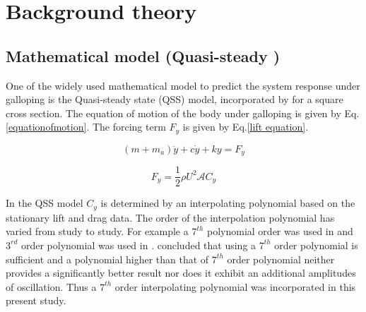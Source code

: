 
\section{Background theory}

\subsection{Mathematical model (Quasi-steady )}

 One of the widely used mathematical model to predict the system response under galloping is the Quasi-steady state (QSS) model, incorporated by \cite{Parkinson1964} for a square cross section. The equation of motion of the body under galloping is given by Eq. \eqref{equationofmotion}. The forcing term $F_y$ is given by Eq.\eqref{lift equation}.
 
 

\begin{equation}
\label{equationofmotion}
(m+m_a)\ddot{y}+c\dot{y}+ky=F_y
\end{equation}

\begin{equation}
\label{lift equation}
F_y=\frac{1}{2}\rho U^2\mathcal{A}C_y
\end{equation}

 In the QSS  model $C_y$ is determined by an interpolating polynomial based on the stationary lift and drag data. The order of the interpolation polynomial has varied from study to study. For  example a $7^{th}$ polynomial order was used in \cite{Parkinson1964} and $3^{rd}$ order polynomial was used in \cite{Barrero-Gil2009}. \cite{Ng2005} concluded that using a $7^{th}$ order polynomial is sufficient and a polynomial higher than that of $7^{th}$ order polynomial neither provides a significantly better result nor does it exhibit an additional amplitudes of oscillation. Thus a $7 ^{th}$ order interpolating polynomial was incorporated in this present study. 

 
